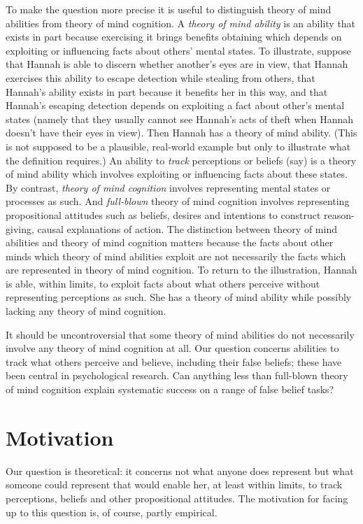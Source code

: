 \documentclass[12pt,\papersize]{extarticle}
\begin{document}
To make the question more precise it is useful to distinguish 
theory of mind abilities from theory of mind cognition.  
A  \textit{theory of mind ability} is an ability that exists in part because exercising it brings benefits obtaining which depends on exploiting or influencing facts about others’ mental states.
To illustrate,
suppose that Hannah is able to discern whether another's eyes are in view,
that Hannah exercises this ability to escape detection while stealing from others,
that Hannah's ability exists in part because it benefits her in this way,
and 
that Hannah's escaping detection depends on exploiting a fact about other's mental states (namely that they usually cannot  see Hannah's acts of theft when Hannah doesn't have their eyes in view).
Then Hannah has a theory of mind ability.
(This is not supposed to be a plausible, real-world example but only to illustrate what the definition requires.)
An ability to \textit{track} perceptions or beliefs (say) is a theory of mind ability which involves exploiting or influencing facts about these states.
By contrast, \textit{theory of mind cognition} involves representing mental states or processes as such.
And \textit{full-blown} theory of mind cognition involves  representing propositional attitudes such as beliefs, desires and intentions to construct reason-giving, causal explanations of action.  
The distinction between theory of mind abilities and theory of mind cognition matters because the facts about other minds which theory of mind abilities exploit are not necessarily the facts which are represented in theory of mind cognition.  
To return to the illustration, Hannah is able, within limits, to exploit facts about what others perceive without representing perceptions as such. 
She has a theory of mind ability while possibly lacking any theory of mind cognition.

It should be uncontroversial that some theory of mind abilities do not necessarily involve any theory of mind cognition at all. 
Our question concerns abilities to track what others perceive and believe, including their false beliefs; these have been central in psychological research.
Can anything less than full-blown theory of mind cognition  explain systematic success on a range of false belief tasks?


\section{Motivation}
Our question is theoretical: it concerns 
not what anyone does represent
but what someone could represent that would enable her, at least within limits, to track perceptions, beliefs and other propositional attitudes.
The motivation for facing up to this question is, of course, partly empirical.
\end{document}
